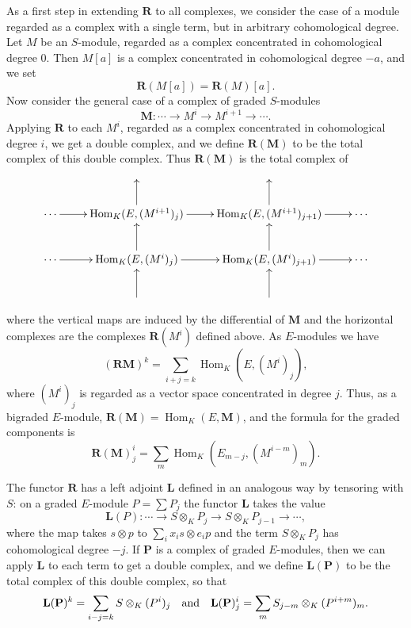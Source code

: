 \documentclass{tran-l}
\newcommand{\myHom}{\operatorname{Hom}}
\newcommand{\LL}{\mathbf{L}}
\newcommand{\MM}{\mathbf{M}}
\newcommand{\PP}{\mathbf{P}}
\newcommand{\RR}{\mathbf{R}}
\theoremstyle{plain}
\theoremstyle{remark}
\theoremstyle{definition}
\begin{document}
As a first step in extending $\RR $ to all complexes,
we consider the case of a module regarded as a complex with a single
term, but in arbitrary cohomological degree. Let $M$ be
an $S$-module, regarded as a complex concentrated in cohomological
degree 0. Then $M[ a]$ is a complex concentrated in
cohomological degree $-a$, and we set
\begin{equation*}\RR (M[ a])=\RR (M)[ a].
\end{equation*}
Now consider the general case of
a complex of graded $S$-modules
\begin{equation*}\MM : \cdots \to M^{i}\to M^{i+1}\to \cdots .
\end{equation*}
Applying $\RR $ to each $M^{i}$, regarded as a complex concentrated
in cohomological degree $i$, we get a double complex,
and we define $\RR (\MM )$ to be the total complex of this double complex.
Thus $\RR (\MM )$ is the total complex of
\begin{equation*}\xy \xymatrix {
&&&\\
\dotsb \ar [r]&\operatorname{Hom}_{K}(E,(M^{i+1})_{j})\ar [u]\ar [r]&
\operatorname{Hom}_{K}(E,(M^{i+1})_{j+1})\ar [u]\ar [r]&\dotsb \\
\dotsb \ar [r]&\operatorname{Hom}_{K}(E,(M^{i})_{j})\ar [u]\ar [r]&
\operatorname{Hom}_{K}(E,(M^{i})_{j+1})\ar [r]\ar [u]&\dotsb \\
{}&{}\ar [u]&{}\ar [u]&\\
}
\endxy \end{equation*}
where the vertical maps are induced by the differential of $\MM $ and
the horizontal complexes are the complexes $\RR (M^{i})$ defined above.
As $E$-modules we have
\begin{equation*}(\RR \MM )^{k}=\sum _{i+j=k} \myHom _{K}(E,(M^{i})_{j}),
\end{equation*}
where $(M^{i})_{j}$ is regarded as a vector space concentrated
in degree $j$. Thus, as a bigraded $E$-module, $\RR (\MM )=\myHom _{K}(E,\MM )$, and
the formula for the graded components is
\begin{equation*}\RR (\MM )^{i}_{j}=\sum _{m} \myHom _{K}(E_{m-j} ,(M^{i-m})_{m}).
\end{equation*}

The functor $\RR $ has a left adjoint $\LL $ defined in an
analogous way by tensoring with $S$: on a graded $E$-module $P=\sum P_{j}$
the functor $\LL $ takes the value
\begin{equation*}\LL (P): \cdots \to S\otimes _{K} P_{j}\to S \otimes _{K}
P_{j-1}\to \cdots ,
\end{equation*}
where the map takes $s\otimes p$ to $\sum _{i}x_{i}s\otimes e_{i}p$
and the term $S\otimes _{K} P_{j}$ has cohomological degree $-j$.
If $\PP $ is a complex of graded $E$-modules, then we can apply
$\LL $ to each term to get a double complex, and we define
$\LL (\PP )$ to be the total complex of this double complex,
so that
\begin{equation*}\LL (\PP )^{k}=\sum _{i-j=k}S\otimes _{K}(P^{i})_{j}
\quad \hbox {and}\quad \LL (\PP )^{i}_{j}=\sum _{m}S_{j-m}\otimes _{K}(P^{i+m})_{m}.
\end{equation*}
\end{document}
